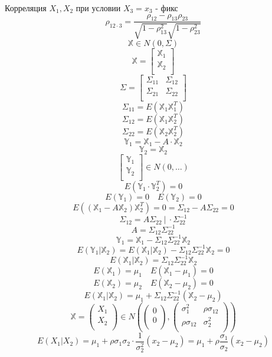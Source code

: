 \documentclass[a4paper]{article}
\theoremstyle{definition}
\theoremstyle{remark}
\begin{document}
Корреляция $ X_1, X_2 $ при условии $ X_3 = x_3 $ - фикс 
\[
    \rho_{12 \cdot 3}
    = \frac{\rho_{12}-\rho_{13}\rho_{23}}{\sqrt{1-\rho_{13}^2}\sqrt{1-\rho_{23}^2}} 
\]
\[
    \mathbb{X} \in N(0, \Sigma)
\]
\[
    \mathbb{X} = \begin{bmatrix}
    \mathbb{X}_1\\
    \mathbb{X}_2\\
    
    \end{bmatrix}
\]
\[
    \Sigma = \begin{bmatrix}
    \Sigma_{11} & \Sigma_{12}\\
    \Sigma_{21} & \Sigma_{22}\\
    
    \end{bmatrix}
\]
\[
    \Sigma_{11} = E(\mathbb{X}_1 \mathbb{X}_1^T)
\]
\[
    \Sigma_{12} = E(\mathbb{X}_1 \mathbb{X}_2^T)
\]
\[
    \Sigma_{22} = E(\mathbb{X}_2 \mathbb{X}_2^T)
\]
\[
    \mathbb{Y}_1 = \mathbb{X}_1 - A \cdot \mathbb{X}_2
\]
\[
    \mathbb{Y}_2 = \mathbb{X}_2
\]
\[
    \begin{bmatrix}
    \mathbb{Y}_1\\
    \mathbb{Y}_2\\
    
    \end{bmatrix}
    \in N(0, \dots)
\]
\[
    E(\mathbb{Y}_1 \cdot \mathbb{Y}_2^T) = 0
\]
\[
    E(\mathbb{Y}_1) = 0 \quad E(\mathbb{Y}_2) = 0
\]
\[
    E((\mathbb{X}_1 - A \mathbb{X}_2) \mathbb{X}_2^T) = 0 = \Sigma_{12} - A
    \Sigma_{22} = 0
\]
\[
    \Sigma_{12} = A \Sigma_{22} \ \big| \ \cdot \Sigma_{22}^{-1}
\]
\[
    A = \Sigma_{12} \Sigma_{22}^{-1}
\]
\[
    \mathbb{Y}_1 = \mathbb{X}_1 - \Sigma_{12} \Sigma_{22}^{-1} \mathbb{X}_2
\]
\[
    E(\mathbb{Y}_1 | \mathbb{X}_2) = E(\mathbb{X}_1 | \mathbb{X}_2) -
    \Sigma_{12}\Sigma_{22}^{-1} \mathbb{X}_2 = 0
\]
\[
    E(\mathbb{X}_1 | \mathbb{X}_2) = \Sigma_{12}\Sigma_{22}^{-1} \mathbb{X}_2
\]
\[
    E(\mathbb{X}_1) = \mu_1 \quad E(\mathbb{X}_1 - \mu_1) = 0
\]
\[
    E(\mathbb{X}_2) = \mu_2 \quad E(\mathbb{X}_2 - \mu_2) = 0
\]
\[
    E(\mathbb{X}_1 | \mathbb{X}_2) = \mu_1 + \Sigma_{12}\Sigma_{22}^{-1}
    (\mathbb{X}_2 - \mu_2)
\]
\[
    \mathbb{X} = \begin{pmatrix}
    X_1\\
    X_2\\
    
    \end{pmatrix} \in N \left( \begin{pmatrix}
    0\\
    0\\
    
    \end{pmatrix},
    \begin{pmatrix}
    \sigma_1^2 & \rho \sigma_{12}\\
    \rho \sigma_{12} & \sigma_{2}^2\\
    
    \end{pmatrix}
    \right)
\]
\[
    E(X_1 | X_2) = \mu_1 + \rho \sigma_1 \sigma_2 \cdot \frac{1}{\sigma_2^2} 
    (x_2 - \mu_2) = \mu_1 + \rho \frac{\sigma_1}{\sigma_2} (x_2 - \mu_2)
\]
\end{document}
